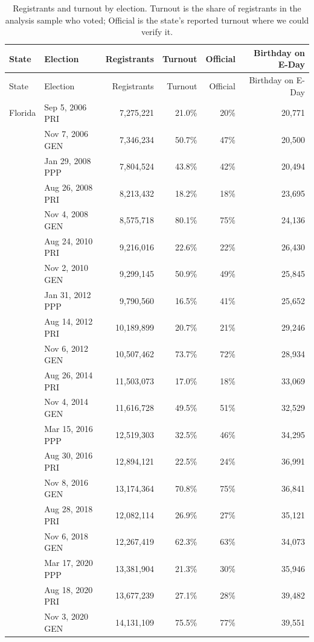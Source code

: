 \begin{longtable}{llrrrr}
\caption{Registrants and turnout by election. Turnout is the share of registrants in the analysis sample who voted; Official is the state's reported turnout where we could verify it.}\label{tab:elections}\\
\toprule
State & Election & Registrants & Turnout & Official & Birthday on E-Day \\
\midrule
\endfirsthead
\toprule
State & Election & Registrants & Turnout & Official & Birthday on E-Day \\
\midrule
\endhead
\bottomrule
\endlastfoot
Florida & Sep 5, 2006 PRI & 7,275,221 & 21.0\% & 20\% & 20,771 \\
 & Nov 7, 2006 GEN & 7,346,234 & 50.7\% & 47\% & 20,500 \\
 & Jan 29, 2008 PPP & 7,804,524 & 43.8\% & 42\% & 20,494 \\
 & Aug 26, 2008 PRI & 8,213,432 & 18.2\% & 18\% & 23,695 \\
 & Nov 4, 2008 GEN & 8,575,718 & 80.1\% & 75\% & 24,136 \\
 & Aug 24, 2010 PRI & 9,216,016 & 22.6\% & 22\% & 26,430 \\
 & Nov 2, 2010 GEN & 9,299,145 & 50.9\% & 49\% & 25,845 \\
 & Jan 31, 2012 PPP & 9,790,560 & 16.5\% & 41\% & 25,652 \\
 & Aug 14, 2012 PRI & 10,189,899 & 20.7\% & 21\% & 29,246 \\
 & Nov 6, 2012 GEN & 10,507,462 & 73.7\% & 72\% & 28,934 \\
 & Aug 26, 2014 PRI & 11,503,073 & 17.0\% & 18\% & 33,069 \\
 & Nov 4, 2014 GEN & 11,616,728 & 49.5\% & 51\% & 32,529 \\
 & Mar 15, 2016 PPP & 12,519,303 & 32.5\% & 46\% & 34,295 \\
 & Aug 30, 2016 PRI & 12,894,121 & 22.5\% & 24\% & 36,991 \\
 & Nov 8, 2016 GEN & 13,174,364 & 70.8\% & 75\% & 36,841 \\
 & Aug 28, 2018 PRI & 12,082,114 & 26.9\% & 27\% & 35,121 \\
 & Nov 6, 2018 GEN & 12,267,419 & 62.3\% & 63\% & 34,073 \\
 & Mar 17, 2020 PPP & 13,381,904 & 21.3\% & 30\% & 35,946 \\
 & Aug 18, 2020 PRI & 13,677,239 & 27.1\% & 28\% & 39,482 \\
 & Nov 3, 2020 GEN & 14,131,109 & 75.5\% & 77\% & 39,551 \\

\end{longtable}
